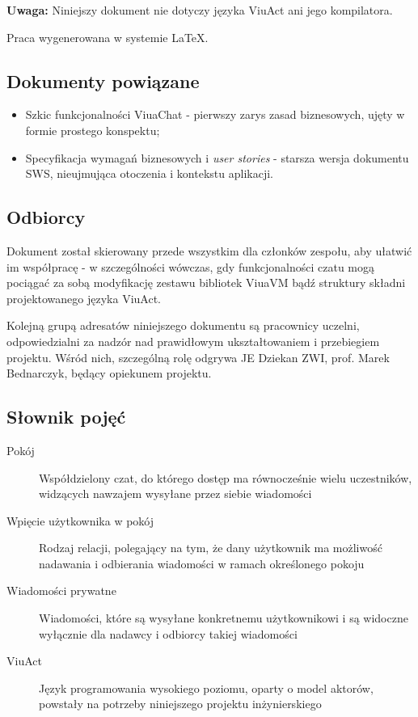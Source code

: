 \documentclass[11pt,oneside,a4paper,titlepage,onecolumn]{article}
\begin{document}
\textbf{Uwaga:} Niniejszy dokument nie dotyczy języka ViuAct ani jego kompilatora.

Praca wygenerowana w systemie \LaTeX.

\subsection{Dokumenty powiązane}
\begin{itemize}
	\item Szkic funkcjonalności ViuaChat - pierwszy zarys zasad biznesowych, ujęty w formie prostego konspektu;
	\item Specyfikacja wymagań biznesowych i \textit{user stories} - starsza wersja dokumentu SWS, nieujmująca otoczenia i kontekstu aplikacji.
\end{itemize}

\subsection{Odbiorcy}
Dokument został skierowany przede wszystkim dla członków zespołu, aby ułatwić im współpracę - w szczególności wówczas, gdy funkcjonalności czatu mogą pociągać za sobą modyfikację zestawu bibliotek ViuaVM bądź struktury składni projektowanego języka ViuAct.

Kolejną grupą adresatów niniejszego dokumentu są pracownicy uczelni, odpowiedzialni za nadzór nad prawidłowym ukształtowaniem i przebiegiem projektu. Wśród nich, szczególną rolę odgrywa JE Dziekan ZWI, prof. Marek Bednarczyk, będący opiekunem projektu.

\subsection{Słownik pojęć}
\begin{description}
  \item[Pokój] Współdzielony czat, do którego dostęp ma równocześnie wielu uczestników, widzących nawzajem wysyłane przez siebie wiadomości
  \item[Wpięcie użytkownika w pokój] Rodzaj relacji, polegający na tym, że dany użytkownik ma możliwość nadawania i odbierania wiadomości w ramach określonego pokoju
  \item[Wiadomości prywatne] Wiadomości, które są wysyłane konkretnemu użytkownikowi i są widoczne wyłącznie dla nadawcy i odbiorcy takiej wiadomości
  \item[ViuAct] Język programowania wysokiego poziomu, oparty o model aktorów, powstały na potrzeby niniejszego projektu inżynierskiego
\end{description}
\end{document}
